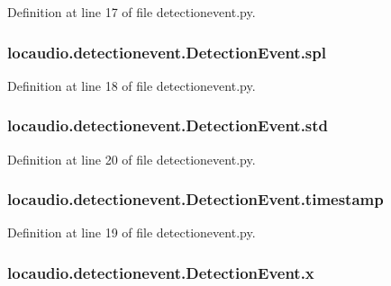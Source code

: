 Definition at line 17 of file detectionevent.\-py.

\hypertarget{classlocaudio_1_1detectionevent_1_1DetectionEvent_aba6f9b944aea803742ef4aed6e34f215}{
\subsubsection[{spl}]{\setlength{\rightskip}{0pt plus 5cm}locaudio.\-detectionevent.\-Detection\-Event.\-spl}}\label{classlocaudio_1_1detectionevent_1_1DetectionEvent_aba6f9b944aea803742ef4aed6e34f215}


Definition at line 18 of file detectionevent.\-py.

\hypertarget{classlocaudio_1_1detectionevent_1_1DetectionEvent_a334aaaf37d349d42cd8c1a46af80181f}{
\subsubsection[{std}]{\setlength{\rightskip}{0pt plus 5cm}locaudio.\-detectionevent.\-Detection\-Event.\-std}}\label{classlocaudio_1_1detectionevent_1_1DetectionEvent_a334aaaf37d349d42cd8c1a46af80181f}


Definition at line 20 of file detectionevent.\-py.

\hypertarget{classlocaudio_1_1detectionevent_1_1DetectionEvent_a6645f181c7102ed07a9f13e7be72f366}{
\subsubsection[{timestamp}]{\setlength{\rightskip}{0pt plus 5cm}locaudio.\-detectionevent.\-Detection\-Event.\-timestamp}}\label{classlocaudio_1_1detectionevent_1_1DetectionEvent_a6645f181c7102ed07a9f13e7be72f366}


Definition at line 19 of file detectionevent.\-py.

\hypertarget{classlocaudio_1_1detectionevent_1_1DetectionEvent_ae36950069a6f55e1f6e0251dbe80b0d4}{
\subsubsection[{x}]{\setlength{\rightskip}{0pt plus 5cm}locaudio.\-detectionevent.\-Detection\-Event.\-x}}\label{classlocaudio_1_1detectionevent_1_1DetectionEvent_ae36950069a6f55e1f6e0251dbe80b0d4}


